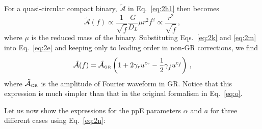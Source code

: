 \documentclass[prd,twocolumn,nofootinbib]{revtex4-1}
\newcommand{\GR}{{\mbox{\tiny GR}}}
\begin{document}
For a quasi-circular compact binary, $\tilde{\mathcal{A}}$ in Eq.~\eqref{eq:2h1} then becomes
\begin{equation}\label{eq:2e}
\tilde{\mathcal{A}}(f) \propto\frac{1}{\sqrt{\dot{f}}}\frac{G}{D_L}\mu r^2f^2 \propto \frac{r^2}{\sqrt{\dot{f}}}  \,,
\end{equation}
where $\mu$ is the reduced mass of the binary.
Substituting Eqs.~\eqref{eq:2k} and \eqref{eq:2m} into Eq.~\eqref{eq:2e} and keeping only to leading order in non-GR corrections, we find
\begin{equation}\label{eq:2n}
\tilde{\mathcal{A}}(f)=\tilde{\mathcal{A}}_{\GR} \left(1+2\gamma_ru^{c_r}-\frac{1}{2}\gamma_{\dot{f}}u^{c_{\dot{f}}}\right)\,,
\end{equation}
where $\tilde{\mathcal{A}}_{\GR} $ is the amplitude of Fourier waveform in GR. Notice that this expression is much simpler than that in the original formalism in Eq.~\eqref{eq:o}.

Let us now show the expressions for the ppE parameters $\alpha$ and $a$ for three different cases using Eq.~\eqref{eq:2n}:
\end{document}
